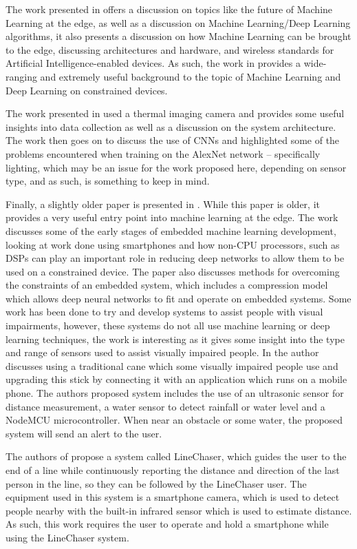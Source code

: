 \documentclass[conference]{IEEEtran}
\begin{document}
The work presented in \cite{b18} offers a discussion on topics like the future of Machine Learning at the edge, as well as a discussion on Machine Learning/Deep Learning algorithms, it also presents a discussion on how Machine Learning can be brought to the edge, discussing architectures and hardware, and wireless standards for Artificial Intelligence-enabled devices. As such, the work in \cite{b18} provides a wide-ranging and extremely useful background to the topic of Machine Learning and Deep Learning on constrained devices. 

The work presented in \cite{b19} used a thermal imaging camera and provides some useful insights into data collection as well as a discussion on the system architecture. The work then goes on to discuss the use of CNNs and highlighted some of the problems encountered when training on the AlexNet network – specifically lighting, which may be an issue for the work proposed here, depending on sensor type, and as such, is something to keep in mind.

Finally, a slightly older paper is presented in \cite{b20}. While this paper is older, it provides a very useful entry point into machine learning at the edge. The work discusses some of the early stages of embedded machine learning development, looking at work done using smartphones and how non-CPU processors, such as DSPs can play an important role in reducing deep networks to allow them to be used on a constrained device. The paper also discusses methods for overcoming the constraints of an embedded system, which includes a compression model which allows deep neural networks to fit and operate on embedded systems. 
Some work has been done to try and develop systems to assist people with visual impairments, however, these systems do not all use machine learning or deep learning techniques, the work is interesting as it gives some insight into the type and range of sensors used to assist visually impaired people. In \cite{b21} the author discusses using a traditional cane which some visually impaired people use and upgrading this stick by connecting it with an application which runs on a mobile phone. The authors proposed system includes the use of an ultrasonic sensor for distance measurement, a water sensor to detect rainfall or water level and a NodeMCU microcontroller. When near an obstacle or some water, the proposed system will send an alert to the user.

The authors of \cite{b22} propose a system called LineChaser, which guides the user to the end of a line while continuously reporting the distance and direction of the last person in the line, so they can be followed by the LineChaser user. The equipment used in this system is a smartphone camera, which is used to detect people nearby with the built-in infrared sensor which is used to estimate distance. As such, this work requires the user to operate and hold a smartphone while using the LineChaser system.
\end{document}
